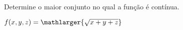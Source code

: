 
Determine o maior conjunto no qual a função é contínua.


\item $ f(x,y,z)=\mathlarger{\sqrt {x+y+z}}$